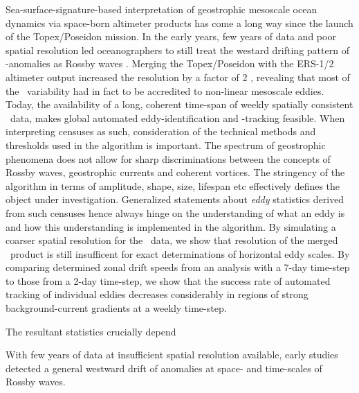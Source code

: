 \label{sec:futureTopics}

Sea-surface-signature-based interpretation of geostrophic mesoscale ocean dynamics via space-born altimeter products has come a long way since the launch of the Topex/Poseidon mission. In the early years, few years of data and poor spatial resolution led oceanographers to still treat the westard drifting pattern of \SSH-anomalies as Rossby waves \citep{matano1993seasonal,cipollini1997concurrent,le1993sea,Killworth1997a}.
Merging the Topex/Poseidon with the ERS-1/2 altimeter output increased the resolution by a factor of 2 \citep{Chelton2007}, revealing that most of the \SSH~variability had in fact to be accredited to non-linear mesoscale eddies. Today, the availability of a long, coherent time-span of weekly spatially consistent \SSH~data, makes global automated eddy-identification and -tracking feasible.
When interpreting censuses as such, consideration of the technical methods and thresholds used in the algorithm is important. The spectrum of geostrophic phenomena does not allow for sharp discriminations between the concepts of Rossby waves, geostrophic currents and coherent vortices.
The stringency of the algorithm in terms of amplitude, shape, size, lifespan etc effectively defines the object under investigation. Generalized statements about \textit{eddy} statistics derived from such censuses hence always hinge on the understanding of what an eddy is and how this understanding is implemented in the algorithm.
By simulating a coarser spatial resolution for the \pop~data, we show that resolution of the merged \avi~product is still insufficent for exact determinations of horizontal eddy scales. By comparing determined zonal drift speeds from an analysis with a 7-day time-step to those from a 2-day time-step, we show that the success rate of automated tracking of individual eddies decreases considerably in regions of strong background-current gradients at a weekly time-step.




The resultant statistics crucially depend





With few years of data at insufficient spatial resolution available, early studies
detected a general westward drift of anomalies at space- and time-scales of Rossby waves.



